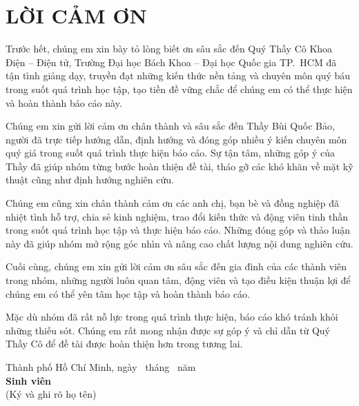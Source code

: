 \chapter*{LỜI CẢM ƠN}

Trước hết, chúng em xin bày tỏ lòng biết ơn sâu sắc đến Quý Thầy Cô Khoa Điện -- Điện tử, Trường Đại học Bách Khoa -- Đại học Quốc gia TP.~HCM đã tận tình giảng dạy, truyền đạt những kiến thức nền tảng và chuyên môn quý báu trong suốt quá trình học tập, tạo tiền đề vững chắc để chúng em có thể thực hiện và hoàn thành báo cáo này.

Chúng em xin gửi lời cảm ơn chân thành và sâu sắc đến Thầy Bùi Quốc Bảo, người đã trực tiếp hướng dẫn, định hướng và đóng góp nhiều ý kiến chuyên môn quý giá trong suốt quá trình thực hiện báo cáo. Sự tận tâm, những góp ý của Thầy đã giúp nhóm từng bước hoàn thiện đề tài, tháo gỡ các khó khăn về mặt kỹ thuật cũng như định hướng nghiên cứu.

Chúng em cũng xin chân thành cảm ơn các anh chị, bạn bè và đồng nghiệp đã nhiệt tình hỗ trợ, chia sẻ kinh nghiệm, trao đổi kiến thức và động viên tinh thần trong suốt quá trình học tập và thực hiện báo cáo. Những đóng góp và thảo luận này đã giúp nhóm mở rộng góc nhìn và nâng cao chất lượng nội dung nghiên cứu.

Cuối cùng, chúng em xin gửi lời cảm ơn sâu sắc đến gia đình của các thành viên trong nhóm, những người luôn quan tâm, động viên và tạo điều kiện thuận lợi để chúng em có thể yên tâm học tập và hoàn thành báo cáo.

Mặc dù nhóm đã rất nỗ lực trong quá trình thực hiện, báo cáo khó tránh khỏi những thiếu sót. Chúng em rất mong nhận được sự góp ý và chỉ dẫn từ Quý Thầy Cô để đề tài được hoàn thiện hơn trong tương lai.

\begin{flushright}
\begin{minipage}{0.7\textwidth}
\raggedleft
Thành phố Hồ Chí Minh, ngày \number\day\ tháng \number\month\ năm \number\year\\
\centering
\textbf{Sinh viên}\\
(Ký và ghi rõ họ tên)
\end{minipage}

\end{flushright}

